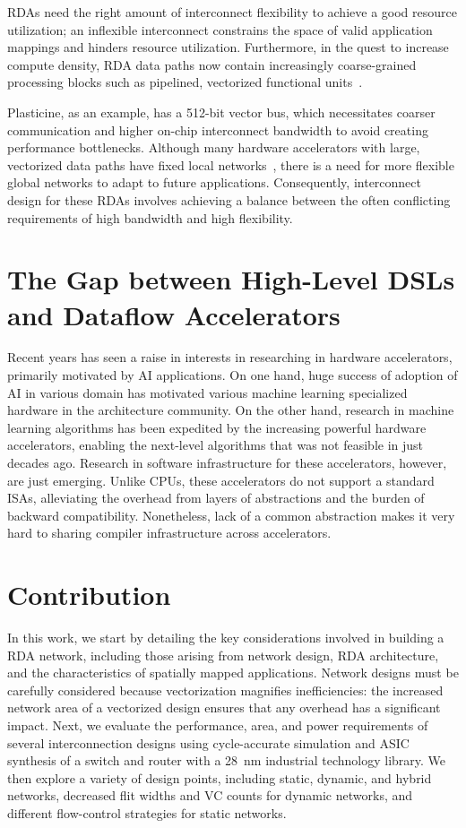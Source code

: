 RDAs need the right amount of interconnect flexibility to achieve a good resource utilization; 
an inflexible interconnect constrains the space of
valid application mappings and hinders resource utilization. 
Furthermore, 
in the quest to increase compute density, RDA data paths now 
contain increasingly coarse-grained processing blocks such as pipelined, vectorized functional 
units~\cite{plasticine, piperench, xilinx-acap}.

Plasticine, as an example, has a 512-bit vector bus, which necessitates coarser communication 
and higher on-chip interconnect bandwidth to avoid creating performance bottlenecks. 
Although many hardware accelerators with large, vectorized data paths have fixed local networks~\cite{brainwave}, there is a need for more
flexible global networks to adapt to future applications.
Consequently, interconnect design for these RDAs involves achieving a balance between the often conflicting requirements of high bandwidth and high flexibility.

\section{The Gap between High-Level DSLs and Dataflow Accelerators}
Recent years has seen a raise in interests in researching in hardware accelerators, primarily
motivated by AI applications. 
On one hand, huge success of adoption of AI in various domain has motivated various machine learning
specialized hardware in the architecture community.
On the other hand, research in machine learning algorithms has been expedited by the increasing
powerful hardware accelerators, enabling the next-level algorithms that was not feasible in just
decades ago.
Research in software infrastructure for these accelerators, however, are just emerging.
Unlike CPUs, these accelerators do not support a standard ISAs, alleviating the overhead from
layers of abstractions and the burden of backward compatibility. 
Nonetheless, lack of a common abstraction makes it very hard to sharing compiler infrastructure
across accelerators. 

\section{Contribution}

In this work, we start by detailing the key considerations involved in building a RDA network, including those arising from network design, RDA architecture, and the characteristics of spatially mapped applications.
Network designs must be carefully considered because vectorization magnifies inefficiencies: the increased network area of a vectorized design ensures that any overhead has a significant impact.
Next, we evaluate the performance, area, and power requirements of several interconnection designs using cycle-accurate simulation and ASIC synthesis of a switch and router with a \SI{28}{nm} industrial technology library.
We then explore a variety of design points, including static, dynamic, and hybrid networks, decreased flit widths and VC counts for dynamic networks, and different flow-control strategies for static networks.

